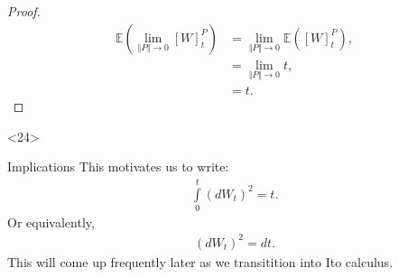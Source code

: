 \documentclass[10pt]{beamer}
\begin{document}
\begin{frame}[t]
\begin{onlyenv}
\begin{proof}
        \begin{align*}
          \mathbb{E}\left( \lim\limits_{\Vert P \Vert \to 0} \left[ W \right]^{P}_{t} \right) &= \lim\limits_{\Vert P \Vert \to 0} \mathbb{E}\left(\left[ W \right]^{P}_{t} \right), \\
          &= \lim\limits_{\Vert P \Vert \to 0} t, \\
          &= t.
        \end{align*}
      \end{proof}
    \end{onlyenv}
    \begin{onlyenv}<24>
      \begin{block}{Implications}
        This motivates us to write:
        \begin{align*}
          \int\limits_{0}^{t}(dW_t)^2 = t.
        \end{align*}
        Or equivalently,
        \begin{align*}
          (dW_t)^2 = dt.
        \end{align*}
        This will come up frequently later as we transitition into Ito calculus.
      \end{block}
  \end{onlyenv}
\end{frame}
\end{document}
